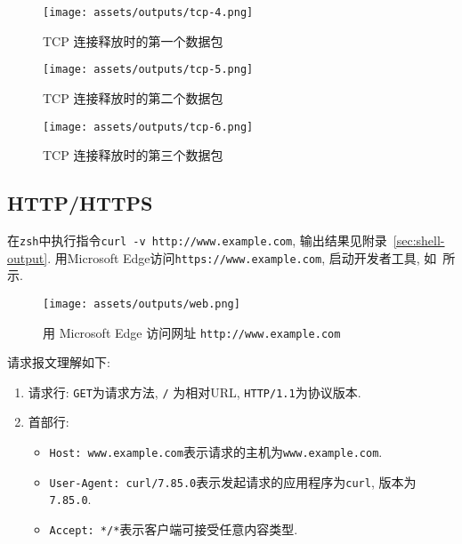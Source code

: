 \documentclass{ned-article}
\begin{document}
\begin{figure}[H]
    \centering
    \texttt{[image: assets/outputs/tcp-4.png]}
    \caption{TCP 连接释放时的第一个数据包}\label{fig:tcp-4}
\end{figure}

\begin{figure}[H]
    \centering
    \texttt{[image: assets/outputs/tcp-5.png]}
    \caption{TCP 连接释放时的第二个数据包}\label{fig:tcp-5}
\end{figure}

\begin{figure}[H]
    \centering
    \texttt{[image: assets/outputs/tcp-6.png]}
    \caption{TCP 连接释放时的第三个数据包}\label{fig:tcp-6}
\end{figure}

\subsection{HTTP/HTTPS}

在\texttt{zsh}中执行指令\texttt{curl -v http://www.example.com}, 输出结果见附录~\ref{sec:shell-output}. 用Microsoft Edge访问\texttt{https://www.example.com}, 启动开发者工具, 如~所示.

\begin{figure}[H]
    \centering
    \texttt{[image: assets/outputs/web.png]}
    \caption{用 Microsoft Edge 访问网址 \texttt{http://www.example.com}}\label{fig:web}
\end{figure}

请求报文理解如下:
\begin{enumerate}[noitemsep]
    \item 请求行: \texttt{GET}为请求方法, \texttt{/} 为相对URL, \texttt{HTTP/1.1}为协议版本.
    \item 首部行:
          \begin{itemize}[noitemsep]
              \item \texttt{Host: www.example.com}表示请求的主机为\texttt{www.example.com}.
              \item \texttt{User-Agent: curl/7.85.0}表示发起请求的应用程序为\texttt{curl}, 版本为\texttt{7.85.0}.
              \item \texttt{Accept: */*}表示客户端可接受任意内容类型.
          \end{itemize}
\end{enumerate}
\end{document}

